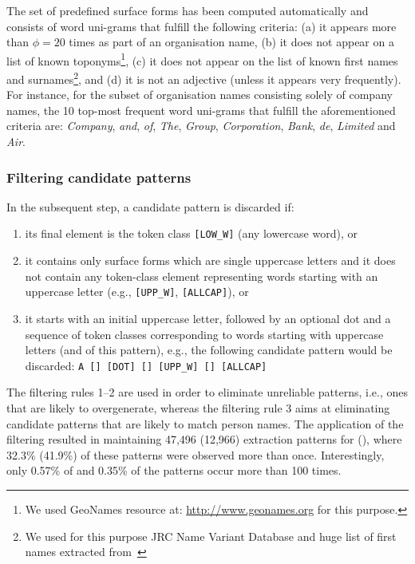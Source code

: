 \documentclass[output=paper]{langsci/langscibook}
\begin{document}
The set of predefined surface forms has been computed automatically and consists of word uni-grams that fulfill the following criteria: (a) it appears more than $\phi=20$ times as part of an organisation name, (b) it does not appear on a list of known toponyms\footnote{We used GeoNames resource at: \url{http://www.geonames.org} for this purpose.}, (c) it does not appear on the list of known first names and surnames\footnote{We used for this purpose {\sc JRC Name Variant Database} and huge list of first names extracted from~\cite{piskorski-11}}, and (d) it is not an adjective (unless it appears very frequently). For instance, for the subset of  organisation names consisting solely of company names, the 10 top-most frequent word uni-grams that fulfill the aforementioned criteria are: \textit{Company}, \textit{and}, \textit{of}, \textit{The}, \textit{Group}, \textit{Corporation}, \textit{Bank}, \textit{de}, \textit{Limited} and \textit{Air}.  

\subsubsection{Filtering candidate patterns} In the subsequent
step, a candidate pattern is discarded if:
\begin{enumerate}
\item its final element is the token class \verb+[LOW_W]+ (any
  lowercase word), or
\item it contains only surface forms which are single uppercase
  letters and it does not contain any token-class element representing
  words starting with an uppercase letter (e.g., \verb+[UPP_W]+,
  \verb+[ALLCAP]+), or
\item it starts with an initial uppercase letter, followed by an
  optional dot and a sequence of token classes corresponding to words
  starting with uppercase letters (and  of this pattern),
  e.g., the following candidate pattern would be discarded:
  \verb+A [] [DOT] [] [UPP_W] [] [ALLCAP]+
\end{enumerate} 

The filtering rules 1--2 are used in order to eliminate
unreliable patterns, i.e., ones that are likely to overgenerate,
whereas the filtering rule 3 aims at eliminating candidate patterns
that are likely to match person names.  The application of the
filtering resulted in maintaining 47,496 (12,966) extraction patterns
for  (), where 32.3\% (41.9\%) of these patterns were
observed more than once. Interestingly, only 0.57\% of  and
0.35\% of the  patterns occur more than 
100 times.
\end{document}
